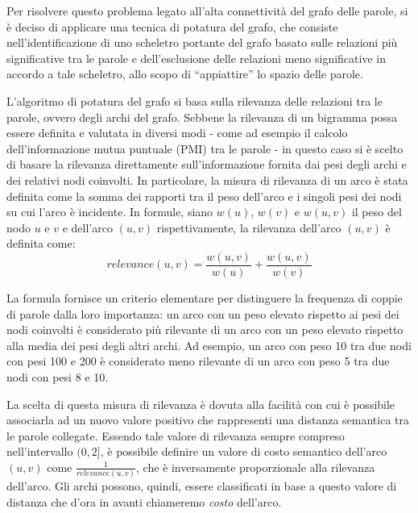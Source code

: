 Per risolvere questo problema legato all'alta connettività del grafo delle parole, si è deciso di applicare
una tecnica di potatura del grafo, che consiste nell'identificazione di uno scheletro portante del grafo
basato sulle relazioni più significative tra le parole e dell'esclusione delle relazioni meno significative in
accordo a tale scheletro, allo scopo di ``appiattire'' lo spazio delle parole.


L'algoritmo di potatura del grafo si basa sulla rilevanza delle relazioni tra le parole, ovvero degli archi del grafo.
Sebbene la rilevanza di un bigramma possa essere definita e valutata in diversi modi - come ad esempio il calcolo
dell'informazione mutua puntuale (PMI) tra le parole - in questo caso si è scelto di basare la rilevanza
direttamente sull'informazione fornita dai pesi degli archi e dei relativi nodi coinvolti.
In particolare, la misura di rilevanza di un arco è stata definita come la somma dei rapporti tra il peso dell'arco
e i singoli pesi dei nodi su cui l'arco è incidente.
In formule, siano $w(u)$, $w(v)$ e $w(u, v)$ il peso del nodo $u$ e $v$ e dell'arco $(u, v)$ rispettivamente,
la rilevanza dell'arco $(u, v)$ è definita come:
\begin{equation*}
    relevance(u, v) = \frac{w(u, v)}{w(u)} + \frac{w(u, v)}{w(v)}
\end{equation*}

La formula fornisce un criterio elementare per distinguere la frequenza di coppie di parole dalla loro importanza:
un arco con un peso elevato rispetto ai pesi dei nodi coinvolti è considerato più rilevante di un arco con un peso
elevato rispetto alla media dei pesi degli altri archi.
Ad esempio, un arco con peso 10 tra due nodi con pesi 100 e 200 è considerato meno rilevante di un arco con peso 5
tra due nodi con pesi 8 e 10. \newline

La scelta di questa misura di rilevanza è dovuta alla facilità con cui è possibile associarla ad un nuovo valore
positivo che rappresenti una distanza semantica tra le parole collegate.
Essendo tale valore di rilevanza sempre compreso nell'intervallo $(0, 2]$, è possibile definire un valore di costo
semantico dell'arco $(u, v)$ come $\frac{1}{relevance(u, v)}$, che è inversamente proporzionale alla
rilevanza dell'arco.
Gli archi possono, quindi, essere classificati in base a questo valore di distanza che d'ora in avanti chiameremo
\textit{costo} dell'arco.

